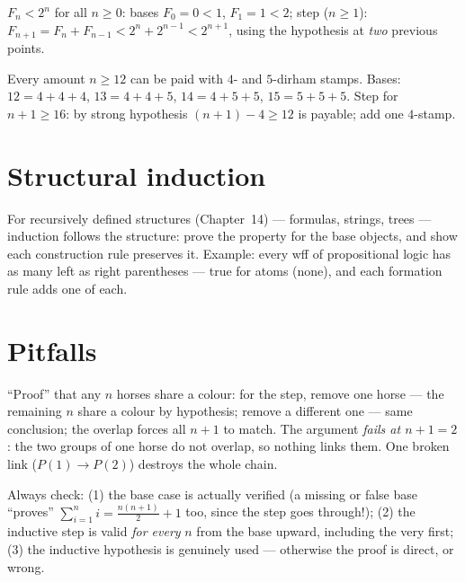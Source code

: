 \begin{example}
$F_n < 2^{n}$ for all $n \geq 0$: bases $F_0 = 0 < 1$, $F_1 = 1 < 2$; step
($n \ge 1$): $F_{n+1} = F_n + F_{n-1} < 2^{n} + 2^{n-1} < 2^{n+1}$, using
the hypothesis at \emph{two} previous points.
\end{example}

\begin{example}
Every amount $n \geq 12$ can be paid with $4$- and $5$-dirham stamps.
Bases: $12 = 4+4+4$, $13 = 4+4+5$, $14 = 4+5+5$, $15 = 5+5+5$. Step for
$n + 1 \geq 16$: by strong hypothesis $(n+1) - 4 \geq 12$ is payable; add
one $4$-stamp.
\end{example}

\section{Structural induction}

For recursively defined structures (Chapter~14) --- formulas, strings, trees
--- induction follows the structure: prove the property for the base
objects, and show each construction rule preserves it. Example: every wff of
propositional logic has as many left as right parentheses --- true for
atoms (none), and each formation rule adds one of each.

\section{Pitfalls}

\begin{example}
``Proof'' that any $n$ horses share a colour: for the step, remove one horse
--- the remaining $n$ share a colour by hypothesis; remove a different one
--- same conclusion; the overlap forces all $n + 1$ to match. The argument
\emph{fails at $n + 1 = 2$}: the two groups of one horse do not overlap, so
nothing links them. One broken link ($P(1) \to P(2)$) destroys the whole
chain.
\end{example}

\begin{notebox}
Always check: (1) the base case is actually verified (a missing or false
base ``proves'' $\sum_{i=1}^n i = \frac{n(n+1)}{2} + 1$ too, since the step
goes through!); (2) the inductive step is valid \emph{for every} $n$ from
the base upward, including the very first; (3) the inductive hypothesis is
genuinely used --- otherwise the proof is direct, or wrong.
\end{notebox}

